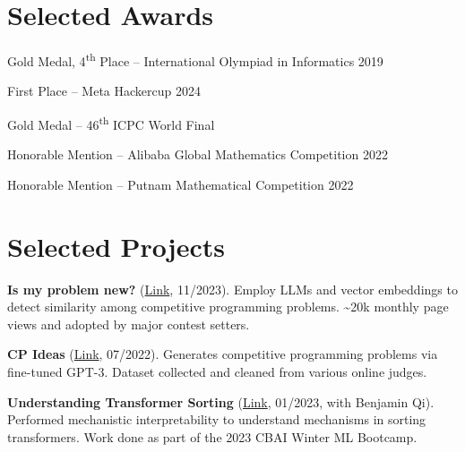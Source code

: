 \documentclass[11pt,letterpaper]{article}
\begin{document}
\section*{Selected Awards}
\begin{outerlist}
\item Gold Medal, 4\textsuperscript{th} Place -- International Olympiad in Informatics 2019
\item First Place -- Meta Hackercup 2024
\item Gold Medal -- 46\textsuperscript{th} ICPC World Final
\item Honorable Mention -- Alibaba Global Mathematics Competition 2022
\item Honorable Mention -- Putnam Mathematical Competition 2022
\end{outerlist}

\section*{Selected Projects}
\begin{outerlist}
\item \textbf{Is my problem new?} (\href{http://yuantiji.ac/}{Link}, 11/2023). Employ LLMs and vector embeddings to detect similarity among competitive programming problems. \sim 20k monthly page views and adopted by major contest setters.
\item \textbf{CP Ideas} (\href{https://fjzzq2002.github.io/cpideas/}{Link}, 07/2022). Generates competitive programming problems via fine-tuned GPT-3. Dataset collected and cleaned from various online judges.
\item \textbf{Understanding Transformer Sorting} (\href{https://github.com/bqi343/transformer-sorting}{Link}, 01/2023, with Benjamin Qi). Performed mechanistic interpretability to understand mechanisms in sorting transformers. Work done as part of the 2023 CBAI Winter ML Bootcamp.
\end{outerlist}
\end{document}
